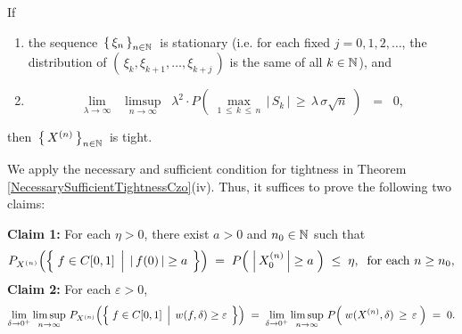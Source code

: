 \begin{lemma}
\begin{itemize}
\end{itemize}
If
\begin{enumerate}
\item	the sequence \,$\left\{\,\xi_{n}\,\right\}_{n\in\mathbb{N}}$\, is stationary
		\vskip 0.1cm
		(i.e. for each fixed $j = 0, 1, 2, \ldots$,
		the distribution of $\left(\,\xi_{k},\xi_{k+1},\ldots,\xi_{k+j}\,\right)$ is the same of all $k\in\mathbb{N}$), and
\item	\begin{equation*}
		\underset{\lambda\rightarrow\infty}{\lim}\;\;
		\underset{n\rightarrow\infty}{\limsup}\;\;
		\lambda^{2}\cdot
		P\!\left(\;\underset{1\,\leq\,k\,\leq\,n}{\max}\,\vert\,S_{k}\,\vert\,\geq\,\lambda\,\sigma\sqrt{n}\;\right)
		\;\;=\;\; 0,
		\end{equation*}
\end{enumerate}
then \,$\left\{\,X^{(n)}\,\right\}_{n\in\mathbb{N}}$\, is tight.
\end{lemma}
\proof
We apply the necessary and sufficient condition for tightness in Theorem \ref{NecessarySufficientTightnessCzo}(iv).
Thus, it suffices to prove the following two claims:

\vskip 0.3cm
\begin{center}
\begin{minipage}{6.5in}
\noindent
\textbf{Claim 1:}\quad
For each $\eta > 0$, there exist $a > 0$ and $n_{0} \in \mathbb{N}$ such that
\begin{equation*}
	P_{X^{(n)}}\!\left(\left\{\;
		f \in \Czo
		\;\left\vert\;\,
		\vert\,f(0)\,\vert \overset{{\color{white}.}}{\geq} a
		\right.
	\;\right\}\right)
	\;=\;
	P\!\left(\; \left\vert\,X^{(n)}_{0}\,\right\vert \overset{{\color{white}.}}{\geq} a \;\right)
	\;\leq\; \eta,
	\;\;\textnormal{for each $n \geq n_{0}$},
\end{equation*}
\vskip 0.3cm
\noindent
\textbf{Claim 2:}\quad
For each $\varepsilon > 0$,
\begin{equation*}
	\lim_{\delta\rightarrow 0^{+}}
	\limsup_{n\rightarrow\infty}\,
	P_{X^{(n)}}\!\left(\left\{\;
		f \in \Czo
		\;\left\vert\;\,
		w(f,\delta) \overset{{\color{white}.}}{\geq} \varepsilon
		\right.
	\;\right\}\right)
	\;=\;
	\lim_{\delta\rightarrow 0^{+}}
	\limsup_{n\rightarrow\infty}\,
	P\!\left(\; w(X^{(n)},\delta) \,\overset{{\color{white}.}}{\geq}\, \varepsilon \;\right)
	\;=\; 0.		
\end{equation*}
\end{minipage}
\end{center}

